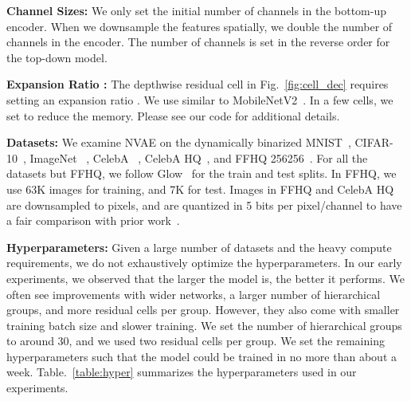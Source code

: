 \documentclass{article}
\begin{document}
\textbf{Channel Sizes:} We only set the initial number of channels in the bottom-up encoder. When we downsample the features spatially, we double the number of channels in the encoder. The number of channels is set in the reverse order for the top-down model.

\textbf{Expansion Ratio :} The depthwise residual cell in Fig.~\ref{fig:cell_dec} requires setting an expansion ratio . We use  similar to MobileNetV2~\cite{sandler2018mobilenetv2}. In a few cells, we set  to reduce the memory. Please see our code for additional details.

\textbf{Datasets:} We examine NVAE on the dynamically binarized MNIST~\cite{lecun1998mnist}, CIFAR-10~\cite{krizhevsky2009cifar}, ImageNet ~\cite{deng2009imagenet}, CelebA ~\cite{liu2015celeba, larsen2016autoencoding}, CelebA HQ~\cite{karras2018progressive}, and FFHQ 256256~\cite{karras2019style}. For all the datasets but FFHQ, we follow Glow~\cite{kingma2018glow} for the train and test splits. In FFHQ, we use 63K images for training, and 7K for test. Images in FFHQ and CelebA HQ are downsampled to  pixels, and are quantized in 5 bits per pixel/channel to have a fair comparison with prior work~\cite{kingma2018glow}.

\textbf{Hyperparameters:} Given a large number of datasets and the heavy compute requirements, we do not exhaustively optimize the hyperparameters. In our early experiments, we observed that the larger the model is, the better it performs. We often see improvements with wider networks, a larger number of hierarchical groups, and more residual cells per group. However, they also come with smaller training batch size and slower training. We set the number of hierarchical groups to around 30, and we used two residual cells per group. We set the remaining hyperparameters such that the model could be trained in no more than about a week. Table.~\ref{table:hyper} summarizes the hyperparameters used in our experiments.
\end{document}
